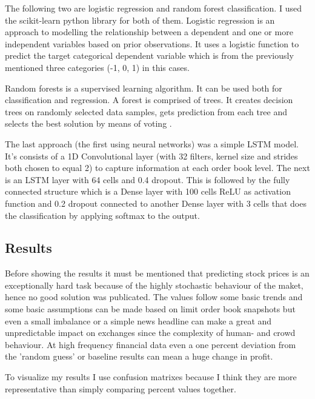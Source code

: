 \documentclass[11pt,a4paper,oneside]{article}
\begin{document}
The following two are logistic regression and random forest classification. I used the scikit-learn python library for 
both of them. Logistic regression is an approach to modelling the relationship between a dependent and one or more 
independent variables based on prior observations. It uses a logistic function to predict the target categorical 
dependent variable which is from the previously mentioned three categories (-1, 0, 1) in this cases.

Random forests is a supervised learning algorithm. It can be used both for classification and regression. A forest is 
comprised of trees. It creates decision trees on randomly selected data samples, gets prediction from each tree and 
selects the best solution by means of voting \cite{randomforest}.

The last approach (the first using neural networks) was a simple LSTM model. It's consists of a 1D Convolutional layer 
(with 32 filters, kernel size and strides both chosen to equal 2) to capture information at each order book level. The 
next is an LSTM layer with 64 cells and 0.4 dropout. This is followed by the fully connected structure which is a Dense 
layer with 100 cells ReLU as activation function and 0.2 dropout connected to another Dense layer with 3 cells that 
does the classification by applying softmax to the output.

\subsection{Results}
\label{sec:results}

Before showing the results it must be mentioned that predicting stock prices is an exceptionally hard task because of 
the highly stochastic behaviour of the maket, hence no good solution was publicated. The values follow some basic trends 
and some basic assumptions can be made based on limit order book snapshots but even a small imbalance or a simple news 
headline can make a great and unpredictable impact on exchanges since the complexity of human- and crowd behaviour. At 
high frequency financial data even a one percent deviation from the 'random guess' or baseline results can mean a huge 
change in profit. 

To visualize my results I use confusion matrixes because I think they are more representative than simply comparing 
percent values together.
\end{document}
